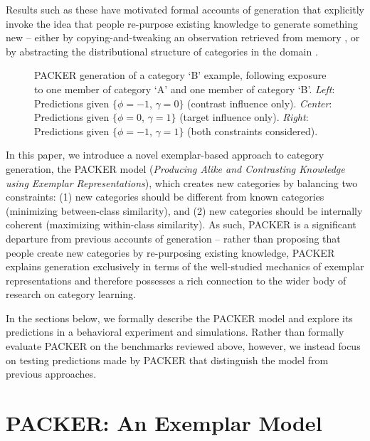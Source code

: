 \documentclass[10pt,letterpaper]{article}
\newcommand\inputpgf[2]{{
\let\pgfimageWithoutPath\pgfimage
\renewcommand{\pgfimage}[2][]{\pgfimageWithoutPath[##1]{#1/##2}}

}}
\begin{document}
Results such as these have motivated formal accounts of generation that explicitly invoke the idea that people re-purpose existing knowledge to generate something new -- either by copying-and-tweaking an observation retrieved from memory \citep{ward2002role,ward1995s}, or by abstracting the distributional structure of categories in the domain \citep{jern2013probabilistic}.


\begin{figure*}
    \begin{center}
    \inputpgf{figs/}{example-prob-spaces.pgf}
    \caption{PACKER generation of a category `B' example, following exposure to one member of category `A' and one member of category `B'. \textit{Left}: Predictions given $\{\phi = -1$, $\gamma = 0\}$ (contrast influence only). \textit{Center}: Predictions given $\{\phi = 0$, $\gamma = 1\}$ (target influence only).  \textit{Right}: Predictions given $\{\phi = -1$, $\gamma = 1\}$ (both constraints considered).  }
    \label{fig:example-prob-spaces}
    \end{center}
\end{figure*}

In this paper, we introduce a novel exemplar-based approach to category generation, the PACKER model (\textit{Producing Alike and Contrasting Knowledge using Exemplar Representations}), which creates new categories by balancing two constraints: (1) new categories should be different from known categories (minimizing between-class similarity), and (2) new categories should be internally coherent (maximizing within-class similarity). As such, PACKER is a significant departure from previous accounts of generation -- rather than proposing that people create new categories by re-purposing existing knowledge, PACKER explains generation exclusively in terms of the well-studied mechanics of exemplar representations and therefore possesses a rich connection to the wider body of research on category learning.

In the sections below, we formally describe the PACKER model and explore its predictions in a behavioral experiment and simulations. Rather than formally evaluate PACKER on the benchmarks reviewed above, however, we instead focus on testing predictions made by PACKER that distinguish the model from previous approaches.


\section{PACKER: An Exemplar Model}
\end{document}
